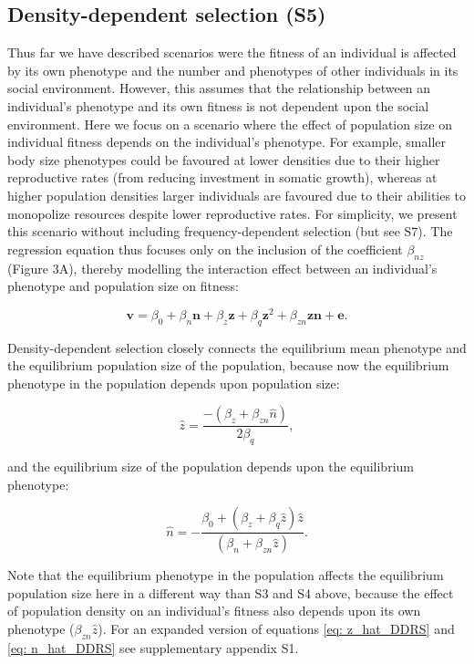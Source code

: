 \documentclass{article}
\begin{document}
 \subsection{Density-dependent selection (S5)}
 Thus far we have described scenarios were the fitness of an individual is affected by its own phenotype and the number and phenotypes of other individuals in its social environment. However, this assumes that the relationship between an individual's phenotype and its own fitness is not dependent upon the social environment. Here we focus on a scenario where the effect of population size on individual fitness depends on the individual's phenotype. For example, smaller body size phenotypes could be favoured at lower densities due to  their higher reproductive rates (from reducing investment in somatic growth), whereas at higher population densities larger individuals are favoured due to their abilities to monopolize resources despite lower reproductive rates. For simplicity, we present this scenario without including frequency-dependent selection (but see S7). The regression equation thus focuses only on the inclusion of the coefficient $\beta_{nz}$ (Figure 3A), thereby modelling the interaction effect between an individual's phenotype and population size on fitness:

\begin{equation} \label{eq: DDRS}
\bm{v}=\beta_{0} +\beta_{n} \bm{n} + \beta_{z} \bm{z} + \beta_{q} \bm{z}^2 +  \beta_{zn} \bm{zn}  +  \bm{e}.
\end{equation}

\noindent Density-dependent selection closely connects the equilibrium mean phenotype and the equilibrium population size of the population, because now the equilibrium phenotype in the population depends upon population size:

\begin{equation} \label{eq: z_hat_DDRS}
\hat{z}=\frac{-(\beta_{z}+\beta_{zn}\hat{n})}{2\beta_{q}},
\end{equation} 

and the equilibrium size of the population depends upon the equilibrium phenotype:

\begin{equation} \label{eq: n_hat_DDRS}
		\hat{n} = -\frac{\beta_{0}+(\beta_{z}  + \beta_{q}\hat{z})\hat{z}}{(\beta_{n} +  \beta_{zn} \hat{z})}.
\end{equation}

\noindent Note that the equilibrium phenotype in the population affects the equilibrium population size here in a different way than S3 and S4 above, because the effect of population density on an individual's fitness also depends upon its own phenotype ($\beta_{zn} \hat{z}$). For an expanded version of equations \ref{eq: z_hat_DDRS} and \ref{eq: n_hat_DDRS} see supplementary appendix S1. 
\end{document}
